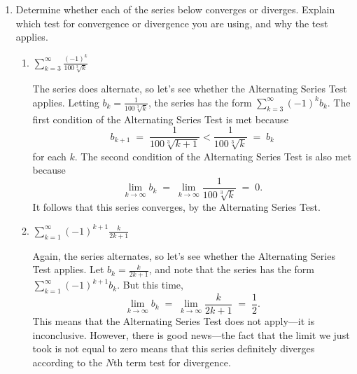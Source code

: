 \documentclass[main]{subfiles}
\begin{document}
\begin{enumerate}
\pspace{\newpage}



\item     \label{test-alt-series}
\begin{problem}
Determine whether each of the series below converges or diverges.  Explain which
test for convergence or divergence you are using, and why the test applies.
\end{problem}

\begin{enumerate}
  \item  
  \begin{problem}[\vfill] 
     $\displaystyle\sum_{k=3}^\infty\frac{(-1)^k}{100\sqrt[3]{k}}$
  \end{problem}

  \begin{solution}
  The series does alternate, so let's see whether the Alternating Series Test
  applies.  Letting $\displaystyle b_k = \frac{1}{100 \sqrt[3]{k}}$, the series
  has the form $\displaystyle \sum_{k = 3}^{\infty} (-1)^{k} b_{k}$.  The first
  condition of the Alternating Series Test is met because
  $$
    b_{k+1} \; = \; \frac{1}{100 \sqrt[3]{k+1}} < \frac{1}{100 \sqrt[3]{k}} \; = \; b_{k}
  $$
  for each $k$.  The second condition of the Alternating Series Test is also
  met because
  $$
    \lim_{k \to \infty} b_{k} \; = \; \lim_{k \to \infty} \frac{1}{100 \sqrt[3]{k}} \; = \; 0.
  $$
  It follows that this series converges, by the Alternating Series Test.
  \end{solution}


  \item  
  \begin{problem}[\vfill]
     $\displaystyle\sum_{k=1}^\infty (-1)^{k+1} \frac{k}{2k + 1}$
  \end{problem}

  \begin{solution}
    Again, the series alternates, so let's see whether the Alternating Series Test
    applies.  Let $\displaystyle b_{k} = \frac{k}{2k + 1}$, and note that the
    series has the form $\displaystyle \sum_{k = 1}^{\infty} (-1)^{k+1} b_{k}$.
    But this time,
    $$
      \lim_{k \to \infty} b_{k} \; = \; \lim_{k \to \infty} \frac{k}{2k + 1} \; = \; \frac{1}{2}.
    $$
    This means that the Alternating Series Test does not apply---it is inconclusive.
    However, there is good news---the fact that the limit we just took is not equal
    to zero means that this series definitely diverges according to the $N$th term
    test for divergence.
  \end{solution}



\end{enumerate}
\end{enumerate}
\end{document}
